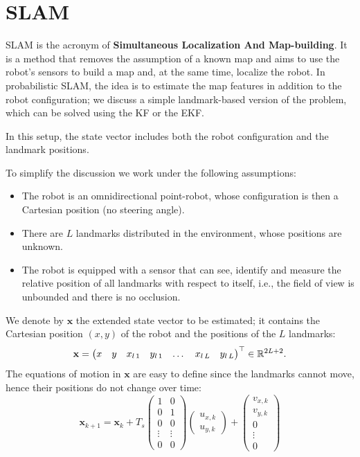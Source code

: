 \documentclass[10pt, a4paper]{report}
\begin{document}
\section{SLAM}
SLAM is the acronym of \textbf{Simultaneous Localization And Map-building}. It is a method that removes the assumption of a known map and aims to use the robot's sensors to 
build a map and, at the same time, localize the robot. In probabilistic SLAM, the idea is to estimate the map 
features in addition to the robot configuration; we discuss a simple landmark-based version of 
the problem, which can be solved using the KF or the EKF. 
\begin{boxobservation}{}{}
    In this setup, the state vector includes both the robot configuration and the landmark positions.
\end{boxobservation}
\noindent To simplify the discussion we work under the following assumptions:\begin{itemize}
    \item The robot is an omnidirectional point-robot, whose 
    configuration is then a Cartesian position (no steering angle).
    \item There are $L$ landmarks distributed in the environment, whose positions are unknown.
    \item The robot is equipped with a sensor that can see, 
    identify and measure the relative position of all 
    landmarks with respect to itself, i.e., the field of view is unbounded and there is no occlusion.
\end{itemize}
We denote by $\mathbf x$ the extended state vector to be estimated; it contains the Cartesian position $(x,y)$ of the robot and the positions of the $L$ landmarks:
\begin{equation}
        \mathbf x = \begin{pmatrix}
            x&y&x_{l\, 1}&y_{l\, 1}&\dots & x_{l\, L}&y_{l\, L}
        \end{pmatrix}^\top\in {\mathbb R}^{2L+2}.
\end{equation}
The equations of motion in $\mathbf x$ are easy to define since the landmarks cannot move, hence their positions do not change over time:\begin{equation}
    \mathbf x_{k+1}=\mathbf x_k+T_s\begin{pmatrix}
        1&0\\ 0&1 \\ 
        0&0 \\
        \vdots&\vdots\\ 0&0
    \end{pmatrix}\begin{pmatrix}
        u_{x,k}\\ u_{y,k}
    \end{pmatrix}+\begin{pmatrix}
        v_{x,k}\\ v_{y,k} \\ 
       0 \\
        \vdots\\ 0
    \end{pmatrix}
\end{equation}
\end{document}
